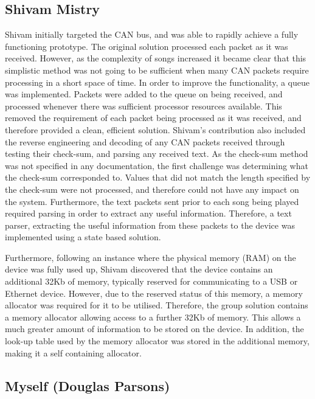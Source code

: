\subsection*{Shivam Mistry}
Shivam initially targeted the CAN bus, and was able to rapidly achieve a fully 
functioning prototype. The original solution processed each packet as it was 
received. However, as the complexity of songs increased it became clear that this 
simplistic method was not going to be sufficient when many CAN packets require 
processing in a short space of time.
In order to improve the functionality, a queue was implemented. Packets were 
added to the queue on being received, and processed whenever there was sufficient
processor resources available.
This removed the requirement of each packet being processed as it was received,
 and therefore provided a clean, efficient solution.
Shivam's contribution also included the reverse engineering and decoding of any
 CAN packets received through testing their check-sum, and parsing any received 
text.
As the check-sum method was not specified in any documentation, the first 
challenge was determining what the check-sum corresponded to. Values that did 
not match the length specified by the check-sum were not processed, and therefore 
could not have any impact on the system. Furthermore, the text packets sent prior 
to each song being played required parsing in order to extract any useful 
information. Therefore, a text parser, extracting the useful information from 
these packets to the device was implemented using a state based solution. 

Furthermore, following an 
instance where the physical memory (RAM) on the device was fully used up, Shivam 
discovered that the device contains an additional 32Kb of memory, 
typically reserved for communicating to a USB or Ethernet device. However, 
due to the reserved status of this memory, a memory allocator was required for 
it to be utilised. 
Therefore, the group solution contains a memory allocator allowing access to 
a further 32Kb of memory. This allows a much greater amount of information to be 
stored on the device. 
In addition, the look-up table used by the memory allocator was stored in the 
additional memory, making it a self containing allocator. 

\subsection*{Myself (Douglas Parsons)}

